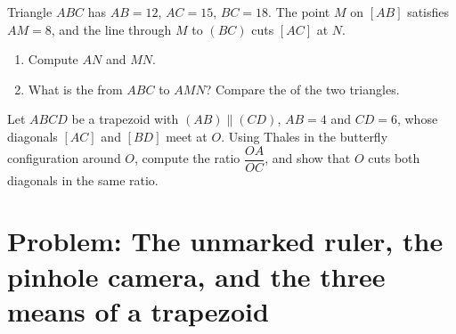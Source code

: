 \begin{exercise}[$\star\star$]\label{exo:g9:thales:8}
Triangle $ABC$ has $AB = 12$, $AC = 15$, $BC = 18$. The point $M$ on
$[AB]$ satisfies $AM = 8$, and the line through $M$  to $(BC)$
cuts $[AC]$ at $N$.
\begin{enumerate}
  \item Compute $AN$ and $MN$.
  \item What is the  from $ABC$ to $AMN$? Compare the
         of the two triangles.
\end{enumerate}
\end{exercise}

\begin{exercise}[$\star\star\star$]\label{exo:g9:thales:9}
Let $ABCD$ be a trapezoid with $(AB) \parallel (CD)$, $AB = 4$ and
$CD = 6$, whose diagonals $[AC]$ and $[BD]$ meet at $O$.
Using Thales in the butterfly configuration around $O$, compute the
ratio $\dfrac{OA}{OC}$, and show that $O$ cuts both diagonals in the
same ratio.
\end{exercise}

\section{Problem: The unmarked ruler, the pinhole camera, and the
three means of a trapezoid}


